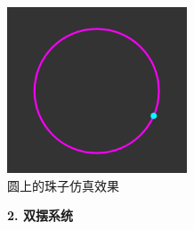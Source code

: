 \documentclass[a4paper, 12pt]{article}
\begin{document}
\begin{center}
\includegraphics[width=0.4\textwidth]{images/bead.png}\\
圆上的珠子仿真效果
\end{center}


\vspace{\baselineskip}

\textbf{2. 双摆系统}
\end{document}
